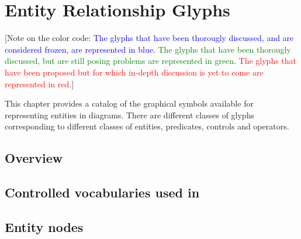 
\chapter{Entity Relationship Glyphs}

[Note on the color code: \textcolor{blue}{The glyphs that have been thorougly discussed, and are considered frozen, are represented in blue}. \textcolor{green}{The glyphs that have been thorougly discussed, but are still posing problems are represented in green}. \textcolor{red}{The glyphs that have been proposed but for which in-depth discussion is yet to come are represented in red}.]

This chapter provides a catalog of the graphical symbols available for representing entities in \ER diagrams.  There are different classes of glyphs corresponding to different classes of entities, predicates, controls and operators.


\section{Overview}
 

 
\section{Controlled vocabularies used in \SBGNERLone}\label{sec:CVs}

%
 
 
 \section{Entity nodes}\label{sec:ENs}

